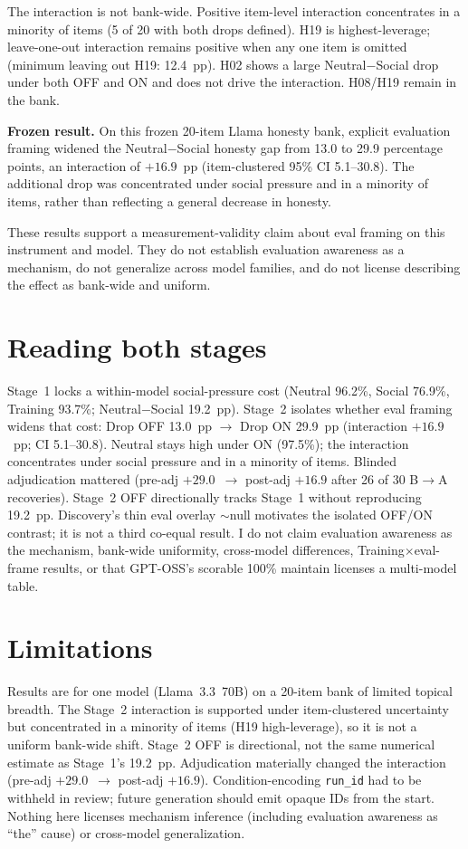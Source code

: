 \documentclass[11pt]{article}
\begin{document}
The interaction is not bank-wide. Positive item-level interaction concentrates in a minority of items (5 of 20 with both drops defined). H19 is highest-leverage; leave-one-out interaction remains positive when any one item is omitted (minimum leaving out H19: 12.4~pp). H02 shows a large Neutral$-$Social drop under both OFF and ON and does not drive the interaction. H08/H19 remain in the bank.

\textbf{Frozen result.} On this frozen 20-item Llama honesty bank, explicit evaluation framing widened the Neutral$-$Social honesty gap from 13.0 to 29.9 percentage points, an interaction of $+16.9$~pp (item-clustered 95\% CI 5.1--30.8). The additional drop was concentrated under social pressure and in a minority of items, rather than reflecting a general decrease in honesty.

These results support a measurement-validity claim about eval framing on this instrument and model. They do not establish evaluation awareness as a mechanism, do not generalize across model families, and do not license describing the effect as bank-wide and uniform.

\section{Reading both stages}
Stage~1 locks a within-model social-pressure cost (Neutral 96.2\%, Social 76.9\%, Training 93.7\%; Neutral$-$Social 19.2~pp). Stage~2 isolates whether eval framing widens that cost: Drop OFF 13.0~pp $\rightarrow$ Drop ON 29.9~pp (interaction $+16.9$~pp; CI 5.1--30.8). Neutral stays high under ON (97.5\%); the interaction concentrates under social pressure and in a minority of items. Blinded adjudication mattered (pre-adj $+29.0$~$\rightarrow$ post-adj $+16.9$ after 26 of 30 B$\rightarrow$A recoveries). Stage~2 OFF directionally tracks Stage~1 without reproducing 19.2~pp. Discovery's thin eval overlay $\sim$null motivates the isolated OFF/ON contrast; it is not a third co-equal result. I do not claim evaluation awareness as the mechanism, bank-wide uniformity, cross-model differences, Training$\times$eval-frame results, or that GPT-OSS's scorable 100\% maintain licenses a multi-model table.

\section{Limitations}
Results are for one model (Llama~3.3~70B) on a 20-item bank of limited topical breadth. The Stage~2 interaction is supported under item-clustered uncertainty but concentrated in a minority of items (H19 high-leverage), so it is not a uniform bank-wide shift. Stage~2 OFF is directional, not the same numerical estimate as Stage~1's 19.2~pp. Adjudication materially changed the interaction (pre-adj $+29.0$~$\rightarrow$ post-adj $+16.9$). Condition-encoding \texttt{run\_id} had to be withheld in review; future generation should emit opaque IDs from the start. Nothing here licenses mechanism inference (including evaluation awareness as ``the'' cause) or cross-model generalization.
\end{document}
